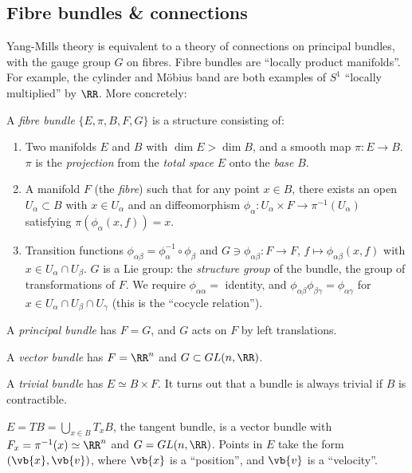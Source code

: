 \documentclass{jknotes}
\begin{document}
\subsection{Fibre bundles \& connections}
Yang-Mills theory is equivalent to a theory of connections on principal bundles, with the gauge group \(G\) on fibres. Fibre bundles are ``locally product manifolds''. For example, the cylinder and M\"obius band are both examples of \(S^1\) ``locally multiplied'' by \(\RR\). More concretely:
\begin{defn}
    A \emph{fibre bundle} \(\{E,\pi,B,F,G\}\) is a structure consisting of:
    \begin{enumerate}
        \item Two manifolds \(E\) and \(B\) with \(\dim E>\dim B\), and a smooth map \(\pi:E\to B\). \(\pi\) is the \emph{projection} from the \emph{total space} \(E\) onto the \emph{base} \(B\).
        \item A manifold \(F\) (the \emph{fibre}) such that for any point \(x\in B\), there exists an open \(U_\alpha\subset B\) with \(x \in U_\alpha\) and an diffeomorphism \(\phi_\alpha:U_\alpha\times F\to \pi^{-1}(U_\alpha)\) satisfying \(\pi(\phi_\alpha(x,f)) = x\).
        \item Transition functions \(\phi_{\alpha\beta}=\phi_\alpha^{-1}\circ\phi_\beta\) and \(G \ni \phi_{\alpha\beta}:F\to F\), \(f\mapsto\phi_{\alpha\beta}(x,f)\) with \(x\in U_\alpha\cap U_\beta\). \(G\) is a Lie group: the \emph{structure group} of the bundle, the group of transformations of \(F\). We require \(\phi_{\alpha\alpha} = \) identity, and \(\phi_{\alpha\beta}\phi_{\beta\gamma} = \phi_{\alpha\gamma}\) for \(x \in U_\alpha\cap U_\beta\cap U_\gamma\) (this is the ``cocycle relation'').
    \end{enumerate}
\end{defn}

A \emph{principal bundle} has \(F=G\), and \(G\) acts on \(F\) by left translations.

A \emph{vector bundle} has \(F=\RR^n\) and \(G \subset GL(n,\RR)\).

A \emph{trivial bundle} has \(E\simeq B \times F\). It turns out that a bundle is always trivial if \(B\) is contractible.

\begin{eg}
    \(E=TB=\bigcup_{x\in B} T_x B\), the tangent bundle, is a vector bundle with \(F_x = \pi^{-1}(x) \simeq \RR^n\) and \(G = GL(n,\RR)\). Points in \(E\) take the form \((\vb{x},\vb{v})\), where \(\vb{x}\) is a ``position'', and \(\vb{v}\) is a ``velocity''.
\end{eg}
\end{document}
